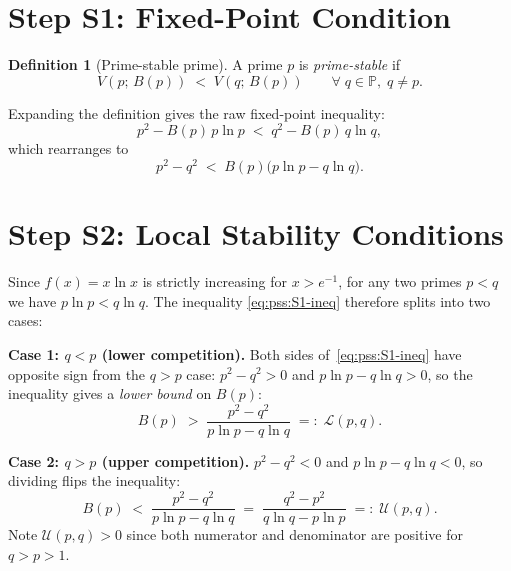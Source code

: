 \documentclass[12pt,a4paper]{article}
\theoremstyle{definition}
\newtheorem{definition}[theorem]{Definition}
\theoremstyle{remark}
\newcommand{\PP}{\mathbb{P}}
\begin{document}
\section{Step S1: Fixed-Point Condition}
\label{sec:pss:s1}

\begin{definition}[Prime-stable prime]
\label{def:pss:stable}
A prime $p$ is \emph{prime-stable} if
\[
  V(p;\,B(p)) \;<\; V(q;\,B(p)) \qquad\forall\; q \in \PP,\; q \neq p.
  \tag{S1}
\]
\end{definition}

Expanding the definition gives the raw fixed-point inequality:
\begin{equation}
  p^2 - B(p)\,p\ln p \;<\; q^2 - B(p)\,q\ln q,
  \label{eq:pss:S1-exp}
\end{equation}
which rearranges to
\begin{equation}
  p^2 - q^2 \;<\; B(p)\bigl(p\ln p - q\ln q\bigr).
  \label{eq:pss:S1-ineq}
\end{equation}

\section{Step S2: Local Stability Conditions}
\label{sec:pss:s2}

Since $f(x) = x\ln x$ is strictly increasing for $x > e^{-1}$, for any two
primes $p < q$ we have $p\ln p < q\ln q$.  The inequality \eqref{eq:pss:S1-ineq}
therefore splits into two cases:

\textbf{Case 1: $q < p$ (lower competition).}
Both sides of~\eqref{eq:pss:S1-ineq} have opposite sign from the $q > p$ case:
$p^2 - q^2 > 0$ and $p\ln p - q\ln q > 0$, so the inequality gives a \emph{lower
bound} on $B(p)$:
\begin{equation}
  B(p) \;>\; \frac{p^2 - q^2}{p\ln p - q\ln q}
  \;=:\; \mathcal{L}(p,q).
  \label{eq:pss:Lpq}
\end{equation}

\textbf{Case 2: $q > p$ (upper competition).}
$p^2 - q^2 < 0$ and $p\ln p - q\ln q < 0$, so dividing flips the inequality:
\begin{equation}
  B(p) \;<\; \frac{p^2 - q^2}{p\ln p - q\ln q}
  \;=\; \frac{q^2 - p^2}{q\ln q - p\ln p}
  \;=:\; \mathcal{U}(p,q).
  \label{eq:pss:Upq}
\end{equation}
Note $\mathcal{U}(p,q) > 0$ since both numerator and denominator are positive for
$q > p > 1$.
\end{document}
